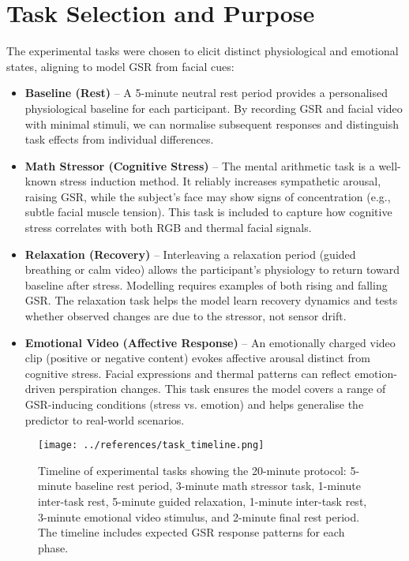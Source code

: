 \documentclass{article}
\begin{document}

\section{Task Selection and Purpose}
The experimental tasks were chosen to elicit distinct physiological and emotional states, aligning to model GSR from facial cues:
\begin{itemize}
    \item \textbf{Baseline (Rest)} -- A 5-minute neutral rest period provides a personalised physiological baseline for each participant. By recording GSR and facial video with minimal stimuli, we can normalise subsequent responses and distinguish task effects from individual differences.
    \item \textbf{Math Stressor (Cognitive Stress)} -- The mental arithmetic task is a well-known stress induction method. It reliably increases sympathetic arousal, raising GSR, while the subject’s face may show signs of concentration (e.g., subtle facial muscle tension). This task is included to capture how cognitive stress correlates with both RGB and thermal facial signals.
    \item \textbf{Relaxation (Recovery)} -- Interleaving a relaxation period (guided breathing or calm video) allows the participant’s physiology to return toward baseline after stress. Modelling requires examples of both rising and falling GSR. The relaxation task helps the model learn recovery dynamics and tests whether observed changes are due to the stressor, not sensor drift.
    \item \textbf{Emotional Video (Affective Response)} -- An emotionally charged video clip (positive or negative content) evokes affective arousal distinct from cognitive stress. Facial expressions and thermal patterns can reflect emotion-driven perspiration changes. This task ensures the model covers a range of GSR-inducing conditions (stress vs. emotion) and helps generalise the predictor to real-world scenarios.
\end{itemize}
\begin{figure}[h]
    \centering
    \texttt{[image: ../references/task\_timeline.png]}
    \caption{Timeline of experimental tasks showing the 20-minute protocol: 5-minute baseline rest period, 3-minute math stressor task, 1-minute inter-task rest, 5-minute guided relaxation, 1-minute inter-task rest, 3-minute emotional video stimulus, and 2-minute final rest period. The timeline includes expected GSR response patterns for each phase.}
\end{figure}
\end{document}
